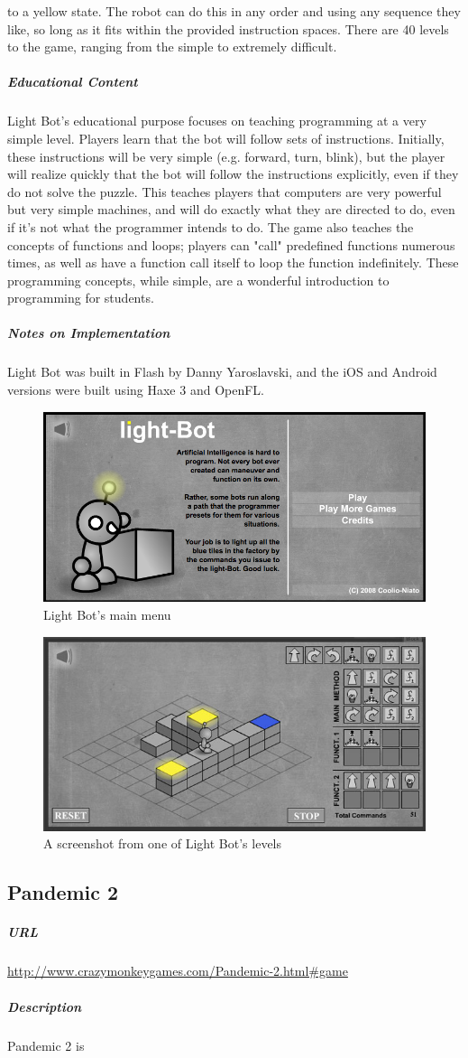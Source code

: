 to a yellow state. The robot can do this in any order and using any sequence they like, so long as it fits within the provided instruction spaces. There are 40 levels to the game, ranging from the simple to extremely difficult.\subparagraph{Educational Content}Light Bot's educational purpose focuses on teaching programming at a very simple level. Players learn that the bot will follow sets of instructions. Initially, these instructions will be very simple (e.g. forward, turn, blink), but the player will realize quickly that the bot will follow the instructions explicitly, even if they do not solve the puzzle. This teaches players that computers are very powerful but very simple machines, and will do exactly what they are directed to do, even if it's not what the programmer intends to do. The game also teaches the concepts of functions and loops; players can "call" predefined functions numerous times, as well as have a function call itself to loop the function indefinitely. These programming concepts, while simple, are a wonderful introduction to programming for students. \subparagraph{Notes on Implementation}Light Bot was built in Flash by Danny Yaroslavski, and the iOS and Android versions were built using Haxe 3 and OpenFL.\newpage\begin{figure}[h!]\centering \includegraphics[height=0.33\textheight]{img/lightbot_title.png}\caption{Light Bot's main menu}\end{figure}\begin{figure}[h!]\centering \includegraphics[height=0.33\textheight]{img/lightbot_screen.jpg}\caption{A screenshot from one of Light Bot's levels}\end{figure}\subsection{Pandemic 2}\subparagraph{URL}\url{http://www.crazymonkeygames.com/Pandemic-2.html#game}\subparagraph{Description}Pandemic 2 is 